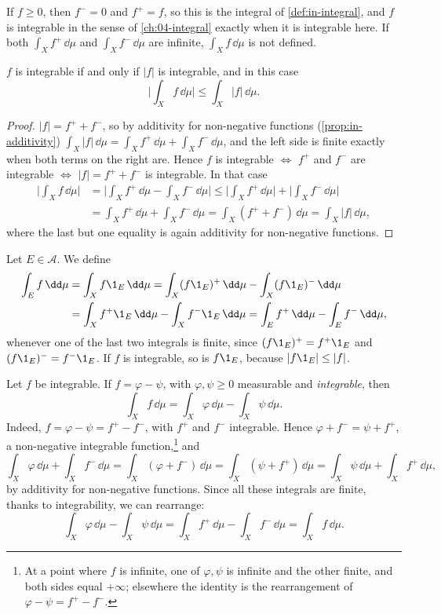 If $f\ge0$, then $f^-=0$ and $f^+=f$, so this is the integral of \cref{def:in-integral}, and $f$
is integrable in the sense of \cref{ch:04-integral} exactly when it is integrable here. If both
$\int_Xf^+\,\dd\mu$ and $\int_Xf^-\,\dd\mu$ are infinite, $\int_Xf\,\dd\mu$ is not defined.

\begin{proposition}\label{prop:ig-abs}
$f$ is integrable if and only if $|f|$ is integrable, and in this case
\[
  \Big|\int_Xf\,\dd\mu\Big|\le\int_X|f|\,\dd\mu .
\]
\end{proposition}

\begin{proof}
$|f|=f^++f^-$, so by additivity for non-negative functions (\cref{prop:in-additivity})
$\int_X|f|\,\dd\mu=\int_Xf^+\,\dd\mu+\int_Xf^-\,\dd\mu$, and the left side is finite exactly
when both terms on the right are. Hence $f$ is integrable $\iff$ $f^+$ and $f^-$ are integrable
$\iff$ $|f|=f^++f^-$ is integrable. In that case
\begin{align*}
  \Big|\int_Xf\,\dd\mu\Big|&=\Big|\int_Xf^+\,\dd\mu-\int_Xf^-\,\dd\mu\Big|
  \le\Big|\int_Xf^+\,\dd\mu\Big|+\Big|\int_Xf^-\,\dd\mu\Big|\\
  &=\int_Xf^+\,\dd\mu+\int_Xf^-\,\dd\mu=\int_X(f^++f^-)\,\dd\mu=\int_X|f|\,\dd\mu,
\end{align*}
where the last but one equality is again additivity for non-negative functions.
\end{proof}

\begin{definition}\label{def:ig-integral-set}
Let $E\in\mathcal A$. We define
\begin{align*}
  \int_Ef\,\dd\mu&=\int_Xf\1_E\,\dd\mu=\int_X(f\1_E)^+\,\dd\mu-\int_X(f\1_E)^-\,\dd\mu\\
  &=\int_Xf^+\1_E\,\dd\mu-\int_Xf^-\1_E\,\dd\mu=\int_Ef^+\,\dd\mu-\int_Ef^-\,\dd\mu,
\end{align*}
whenever one of the last two integrals is finite, since $(f\1_E)^+=f^+\1_E$ and
$(f\1_E)^-=f^-\1_E$. If $f$ is integrable, so is $f\1_E$, because $|f\1_E|\le|f|$.
\end{definition}

\begin{remark}\label{rem:ig-difference}
Let $f$ be integrable. If $f=\varphi-\psi$, with $\varphi,\psi\ge0$ measurable and
\emph{integrable}, then
\[
  \int_Xf\,\dd\mu=\int_X\varphi\,\dd\mu-\int_X\psi\,\dd\mu .
\]
Indeed, $f=\varphi-\psi=f^+-f^-$, with $f^+$ and $f^-$ integrable. Hence
$\varphi+f^-=\psi+f^+$, a non-negative integrable function,\footnote{At a point where $f$ is
infinite, one of $\varphi,\psi$ is infinite and the other finite, and both sides equal
$+\infty$; elsewhere the identity is the rearrangement of $\varphi-\psi=f^+-f^-$.} and
\[
  \int_X\varphi\,\dd\mu+\int_Xf^-\,\dd\mu=\int_X(\varphi+f^-)\,\dd\mu=\int_X(\psi+f^+)\,\dd\mu
  =\int_X\psi\,\dd\mu+\int_Xf^+\,\dd\mu,
\]
by additivity for non-negative functions. Since all these integrals are finite, thanks to
integrability, we can rearrange:
\[
  \int_X\varphi\,\dd\mu-\int_X\psi\,\dd\mu=\int_Xf^+\,\dd\mu-\int_Xf^-\,\dd\mu=\int_Xf\,\dd\mu .
\]
\end{remark}

